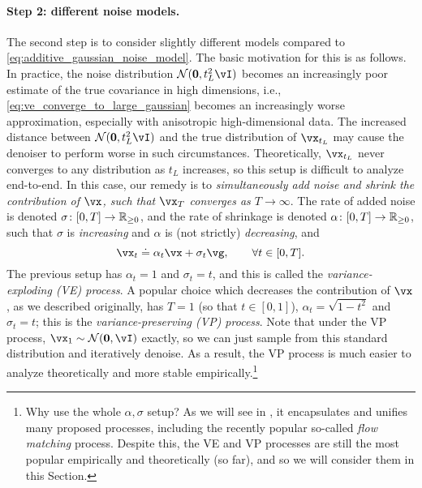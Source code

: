 \documentclass[../../book-main.tex]{subfiles}
\begin{document}
\paragraph{Step 2: different noise models.} The second step is to consider slightly different models compared to \eqref{eq:additive_gaussian_noise_model}. The basic motivation for this is as follows. In practice, the noise distribution \(\dNorm(\vzero, t_{L}^{2}\vI)\) becomes an increasingly poor estimate of the true covariance in high dimensions, i.e., \eqref{eq:ve_converge_to_large_gaussian} becomes an increasingly worse approximation, especially with anisotropic high-dimensional data. The increased distance between \(\dNorm(\vzero, t_{L}^{2}\vI)\) and the true distribution of \(\vx_{t_{L}}\) may cause the denoiser to perform worse in such circumstances. Theoretically, \(\vx_{t_{L}}\) never converges to any distribution as \(t_{L}\) increases, so this setup is difficult to analyze end-to-end. In this case, our remedy is to \textit{simultaneously add noise and shrink the contribution of \(\vx\), such that \(\vx_{T}\) converges as \(T \to \infty\)}. The rate of added noise is denoted \(\sigma \colon [0, T] \to \mathbb{R}_{\geq 0}\), and the rate of shrinkage is denoted \(\alpha \colon [0, T] \to \mathbb{R}_{\geq 0}\), such that \(\sigma\) is \textit{increasing} and \(\alpha\) is (not strictly) \textit{decreasing}, and 
\begin{equation}\label{eq:gen_additive_gaussian_noise_model}
	\vx_{t} \doteq \alpha_{t}\vx + \sigma_{t}\vg, \qquad \forall t \in [0, T].
\end{equation}
The previous setup has \(\alpha_{t} = 1\) and \(\sigma_{t} = t\), and this is called the \textit{variance-exploding (VE) process}. A popular choice which decreases the contribution of \(\vx\), as we described originally, has \(T = 1\) (so that \(t \in [0, 1]\)), \(\alpha_{t} = \sqrt{1 - t^{2}}\) and \(\sigma_{t} = t\); this is the \textit{variance-preserving (VP) process}. Note that under the VP process, \(\vx_{1} \sim \dNorm(\vzero, \vI)\) exactly, so we can just sample from this standard distribution and iteratively denoise. As a result, the VP process is much easier to analyze theoretically and more stable empirically.\footnote{Why use the whole \(\alpha, \sigma\) setup? As we will see in , it encapsulates and unifies many proposed processes, including the recently popular so-called \textit{flow matching} process. Despite this, the VE and VP processes are still the most popular empirically and theoretically (so far), and so we will consider them in this Section.} 
\end{document}
